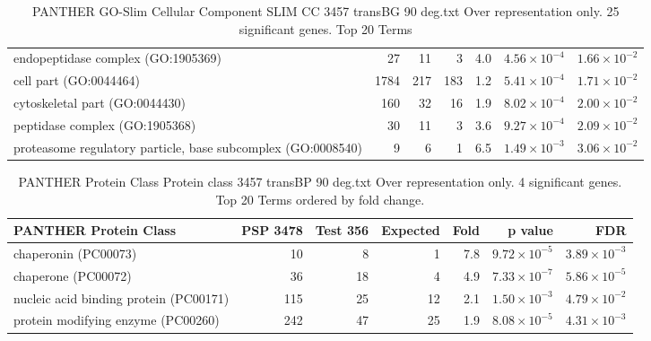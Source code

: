 \begin{table}[ht]
\begin{adjustbox}{width=\textwidth}
\begin{tabular}{lrrrrrr}
  endopeptidase complex (GO:1905369) & 27 & 11 & 3 & 4.0 & $4.56 \times 10^{-4}$ & $1.66 \times 10^{-2}$ \\ 
  cell part (GO:0044464) & 1784 & 217 & 183 & 1.2 & $5.41 \times 10^{-4}$ & $1.71 \times 10^{-2}$ \\ 
  cytoskeletal part (GO:0044430) & 160 & 32 & 16 & 1.9 & $8.02 \times 10^{-4}$ & $2.00 \times 10^{-2}$ \\ 
  peptidase complex (GO:1905368) & 30 & 11 & 3 & 3.6 & $9.27 \times 10^{-4}$ & $2.09 \times 10^{-2}$ \\ 
  proteasome regulatory particle, base subcomplex (GO:0008540) & 9 & 6 & 1 & 6.5 & $1.49 \times 10^{-3}$ & $3.06 \times 10^{-2}$ \\ 
   \hline
\end{tabular}
\end{adjustbox}
\caption{PANTHER GO-Slim Cellular Component SLIM CC 3457 transBG 90 deg.txt Over representation only. 25 significant genes. Top 20 Terms} 
\label{tab:PANTHER GO-Slim Cellular Component SLIM CC 3457 transBG 90 deg.txt Over representation only. 25 significant genes. Top 20 Terms}
\end{table}



\begin{table}[ht]
\centering
\begin{adjustbox}{width=\textwidth}
\begin{tabular}{lrrrrrr}
  \hline
PANTHER Protein Class & PSP 3478 & Test 356 & Expected & Fold & p value & FDR \\ 
  \hline
chaperonin (PC00073) & 10 & 8 & 1 & 7.8 & $9.72 \times 10^{-5}$ & $3.89 \times 10^{-3}$ \\ 
  chaperone (PC00072) & 36 & 18 & 4 & 4.9 & $7.33 \times 10^{-7}$ & $5.86 \times 10^{-5}$ \\ 
  nucleic acid binding protein (PC00171) & 115 & 25 & 12 & 2.1 & $1.50 \times 10^{-3}$ & $4.79 \times 10^{-2}$ \\ 
  protein modifying enzyme (PC00260) & 242 & 47 & 25 & 1.9 & $8.08 \times 10^{-5}$ & $4.31 \times 10^{-3}$ \\ 
   \hline
\end{tabular}
\end{adjustbox}
\caption{PANTHER Protein Class Protein class 3457 transBP 90 deg.txt Over representation only. 4 significant genes. Top 20 Terms ordered by fold change. } 
\label{tab:PANTHER Protein Class Protein class 3457 transBP 90 deg.txt Over representation only. 4 significant genes. Top 20 Terms ordered by fold change. }
\end{table}


